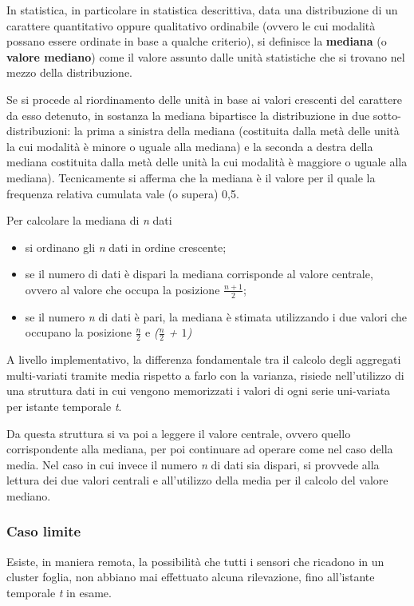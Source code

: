 \documentclass[12pt,a4paper,twoside,openright]{book}
\begin{document}
In statistica, in particolare in statistica descrittiva, data una distribuzione di un carattere quantitativo oppure qualitativo ordinabile (ovvero le cui modalità possano essere ordinate in base a qualche criterio), si definisce la \textbf{mediana} (o \textbf{valore mediano}) come il valore assunto dalle unità statistiche che si trovano nel mezzo della distribuzione. 

Se si procede al riordinamento delle unità in base ai valori crescenti del carattere da esso detenuto, in sostanza la mediana bipartisce la distribuzione in due sotto-distribuzioni: la prima a sinistra della mediana (costituita dalla metà delle unità la cui modalità è minore o uguale alla mediana) e la seconda a destra della mediana costituita dalla metà delle unità la cui modalità è maggiore o uguale alla mediana). Tecnicamente si afferma che la mediana è il valore per il quale la frequenza relativa cumulata vale (o supera) 0,5. 

Per calcolare la mediana di \textit{n} dati \cite{15a} 
\begin{itemize}
\item si ordinano gli \textit{n} dati in ordine crescente;
\item se il numero di dati è dispari la mediana corrisponde al valore centrale, ovvero al valore che occupa la posizione \textbf{$\frac{n+1}{2}$};
\item se il numero \textit{n} di dati è pari, la mediana è stimata utilizzando i due valori che occupano la posizione \textit{$\frac{n}{2}$} e \textit{($\frac{n}{2}$ + $1$)}
\end{itemize}

A livello implementativo, la differenza fondamentale tra il calcolo degli aggregati multi-variati tramite media rispetto a farlo con la varianza, risiede nell'utilizzo di una struttura dati in cui vengono memorizzati i valori di ogni serie uni-variata per istante temporale \textit{t}.

Da questa struttura si va poi a leggere il valore centrale, ovvero quello corrispondente alla mediana, per poi continuare ad operare come nel caso della media. Nel caso in cui invece il numero \textit{n} di dati sia dispari, si provvede alla lettura dei due valori centrali e all'utilizzo della media per il calcolo del valore mediano.

\subsubsection{Caso limite}
Esiste, in maniera remota, la possibilità che tutti i sensori che ricadono in un cluster foglia, non abbiano mai effettuato alcuna rilevazione, fino all'istante temporale \textit{t} in esame. 
\end{document}
